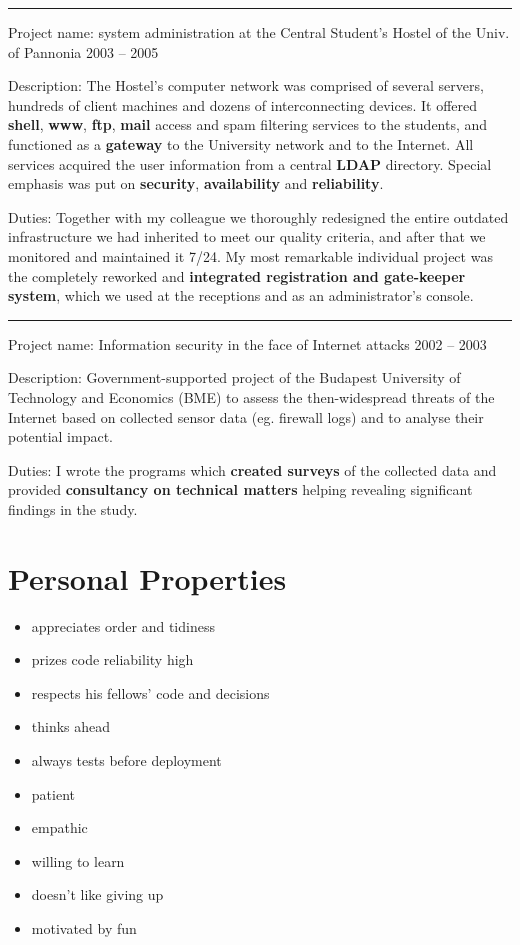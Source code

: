 \documentclass[a4paper,12pt]{article}
\newcommand\Yell{\textbf}
\newcommand\Label{\textsf}
\newcommand{\compress}{\setlength\itemsep{-\parskip}}
\newcommand{\midline}{\rule[0.5ex]{\linewidth-\parindent}{.5pt}}
\begin{document}
\midline\par
\Label{Project name}: system administration at the Central Student's Hostel
of the Univ. of Pannonia\hfill
\Label{2003 -- 2005}\par
\Label{Description}: The Hostel's computer network was comprised of several
servers, hundreds of client machines and dozens of interconnecting devices.
It offered \Yell{shell}, \Yell{www}, \Yell{ftp}, \Yell{mail} access and spam
filtering services to the students, and functioned as a \Yell{gateway} to
the University network and to the Internet.  All services acquired the user
information from a central \Yell{LDAP} directory.  Special emphasis was put on
\Yell{security}, \Yell{availability} and \Yell{reliability}.\par
\Label{Duties}: Together with my colleague we thoroughly redesigned the entire
outdated infrastructure we had inherited to meet our quality criteria, and
after that we monitored and maintained it 7/24.  My most remarkable individual
project was the completely reworked and \Yell{integrated registration and
gate-keeper system}, which we used at the receptions and as an administrator's
console.

\midline\par
\Label{Project name}: Information security in the face of Internet attacks\hfill
\Label{2002 -- 2003}\par
\Label{Description}: Government-supported project of the Budapest University
of Technology and Economics (BME) to assess the then-widespread threats of
the Internet based on collected sensor data (eg. firewall logs) and
to analyse their potential impact.\par
\Label{Duties}: I wrote the programs which \Yell{created surveys} of
the collected data and provided \Yell{consultancy on technical matters}
helping revealing significant findings in the study.

\section{Personal Properties}

\begin{multicols}{2}
\begin{itemize}\compress
\item	appreciates order and tidiness
\item	prizes code reliability high
\item	respects his fellows' code and decisions
\item	thinks ahead
\item	always tests before deployment
\columnbreak
\item	patient
\item	empathic
\item	willing to learn
\item	doesn't like giving up
\item	motivated by fun
\end{itemize}
\end{multicols}
\end{document}
